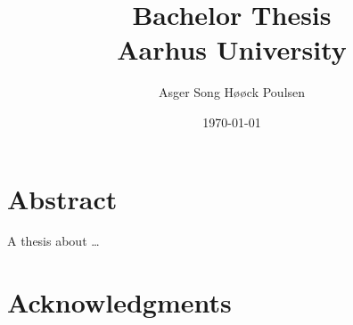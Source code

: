 \documentclass{report}
\title{Bachelor Thesis \\ {\Large Aarhus University}}
\author{Asger Song Høøck Poulsen}
\date{\today}
\begin{document}
\maketitle
\chapter*{Abstract}
    A thesis about \dots

\chapter*{Acknowledgments}

\tableofcontents



\end{document}
